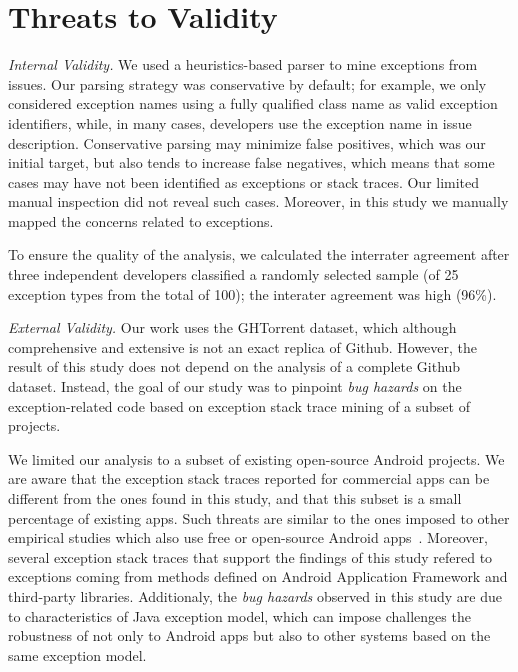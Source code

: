 \documentclass[conference]{IEEEtran}
\begin{document}
\section{Threats to Validity}
\label{sec:threats}

\emph{Internal Validity.} We used a heuristics-based parser to mine
exceptions from issues.  Our parsing strategy was conservative by default; for
example, we only considered exception names using a fully qualified class name
as valid exception identifiers, while, in many cases, developers use the
exception name in issue description. Conservative parsing may minimize false
positives, which was our initial target, but also tends to increase false
negatives, which means that some cases may have not been identified as
exceptions or stack traces. Our limited manual inspection did not reveal such
cases. Moreover, in this study we manually mapped the concerns related
to exceptions.

 To ensure the quality of the analysis, we calculated the interrater agreement after three independent 
developers classified a randomly selected sample (of 25 exception 
types from the total of 100); the interater agreement was high (96\%). 



\emph{External Validity.} Our work uses the GHTorrent dataset, which although 
comprehensive and extensive is not an exact replica of Github. 
However, the result of this study does not depend on the analysis of
a complete Github dataset. Instead, the goal of our study was to 
pinpoint \emph{bug hazards} on the exception-related code based on 
exception stack trace mining of a subset of projects.

We limited our analysis to a subset of existing open-source Android projects.
We are aware that the exception stack traces reported 
for commercial apps can be different from the ones found in this study, and that
this subset is a small percentage of existing apps.
Such threats are similar to the ones imposed to other empirical studies 
which also use free or open-source Android apps~\cite{Linar13,McDon13,Ruiz12}.
Moreover, several exception stack traces that support the findings of this study
refered to exceptions coming from methods defined on Android Application Framework
and third-party libraries.  Additionaly,  the \emph{bug hazards} observed in this study are due to
characteristics of Java exception model, which can impose challenges 
the robustness of not only to Android apps but also to other systems
 based on the same exception model. 
\end{document}
